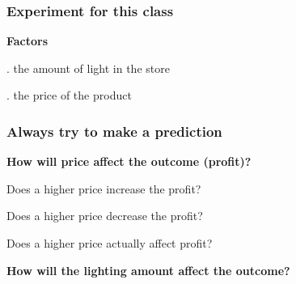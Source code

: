 \begin{frame}\frametitle{Experiment for this class}
	
	{\LARGE\textbf{{\color{purple} Factors}}}
	
	\vspace{24pt}
		. the amount of light in the store
		
	\vspace{12pt}
	
		\pause
		. the price of the product
	
\end{frame}

\begin{frame}\frametitle{Always try to make a prediction}
	
	{\LARGE\textbf{{\color{purple} How will price affect the outcome (profit)?}}}
	\pause
	
	\vspace{24pt}
		\qquad Does a higher price increase the profit?
		\pause
	
	\vspace{12pt}	
		\qquad Does a higher price decrease the profit?
		
		\pause
		
	\vspace{12pt}
		\qquad Does a higher price actually affect profit?
		
		\pause
		
	\vspace{24pt}
	\pause
	
	{\LARGE\textbf{{\color{purple} How will the lighting amount affect the outcome?}}}
\end{frame}

{
\begin{frame}\frametitle{}
\end{frame}}

{
\begin{frame}\frametitle{}
\end{frame}}

{
\begin{frame}\frametitle{}
\end{frame}}

